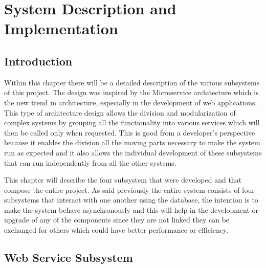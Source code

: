 \chapter{System Description and Implementation}
\label{chap:sys-desc}

\section{Introduction}
\label{chap4:sec:intro}
Within this chapter there will be a detailed description of the various
subsystems of this project. The design was inspired by the Microservice
architecture which is the new trend in architecture, especially in the
development of web applications.
This type of architecture design allows the division and modularization of
complex systems by grouping all the functionality into various services which
will then be called only when requested. This is good from a developer's
perspective because it enables the division all the moving parts necessary to
make the system run as expected and it also allows the individual development of
these subsystems that can run independently from all the other systems.

This chapter will describe the four subsystem that were developed and that
compose the entire project. As said previously the entire system consists of
four subsystems that interact with one another using the database, the intention
is to make the system behave asynchronously and this will help in the
development or upgrade of any of the components since they are not linked they
can be exchanged for others which could have better performance or efficiency.

\section{Web Service Subsystem}
\label{chap4:sec:web-sys}

